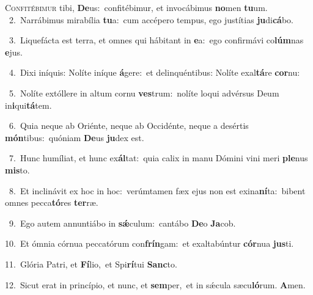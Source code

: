 \lettrine{\initial\textcolor{\initialcolor}{C}}{onfitébimur} tibi, \textbf{De}\-us:~\star confitébimur, et invocábimus \textbf{no}\-men \textbf{tu}\-um.\\
{\numbfont\textcolor{\numbcolor}{~2.}}~Narrábimus mirabília \textbf{tu}\-a:~\star cum accépero tempus, ego justítias \textbf{ju}\-di\-\textbf{cá}\-bo.\par
{\numbfont\textcolor{\numbcolor}{~3.}}~Liquefácta est terra, et omnes qui hábitant in \textbf{e}\-a:~\star ego confirmávi co\-\textbf{lúm}\-nas \textbf{e}\-jus.\par
{\numbfont\textcolor{\numbcolor}{~4.}}~Dixi iníquis: Nolíte iníque \textbf{á}\-gere:~\star et delinquéntibus: Nolíte exal\-\textbf{tá}\-re \textbf{cor}\-nu:\par
{\numbfont\textcolor{\numbcolor}{~5.}}~Nolíte extóllere in altum cornu \textbf{ves}\-trum:~\star nolíte loqui advérsus Deum in\-\textbf{i}\-qui\-\textbf{tá}\-tem.\par
{\numbfont\textcolor{\numbcolor}{~6.}}~Quia neque ab Oriénte, neque ab Occidénte, neque a desértis \textbf{món}\-tibus:~\star quóniam \textbf{De}\-us \textbf{ju}\-dex est.\par
{\numbfont\textcolor{\numbcolor}{~7.}}~Hunc humíliat, et hunc ex\-\textbf{ál}\-tat:~\star quia calix in manu Dómini vini meri \textbf{ple}\-nus \textbf{mis}\-to.\par
{\numbfont\textcolor{\numbcolor}{~8.}}~Et inclinávit ex hoc in hoc:~\dagger verúmtamen fæx ejus non est exina\-\textbf{ní}\-ta:~\star bibent omnes pecca\-\textbf{tó}\-res \textbf{ter}\-ræ.\par
{\numbfont\textcolor{\numbcolor}{~9.}}~Ego autem annuntiábo in \textbf{sǽ}\-culum:~\star cantábo \textbf{De}\-o \textbf{Ja}\-cob.\par
{\numbfont\textcolor{\numbcolor}{10.}}~Et ómnia córnua peccatórum con\-\textbf{frín}\-gam:~\star et exaltabúntur \textbf{cór}\-nua \textbf{jus}\-ti.\par
{\numbfont\textcolor{\numbcolor}{11.}}~Glória Patri, et \textbf{Fí}\-lio,~\star et Spi\-\textbf{rí}\-tui \textbf{Sanc}\-to.\par
{\numbfont\textcolor{\numbcolor}{12.}}~Sicut erat in princípio, et nunc, et \textbf{sem}\-per,~\star et in sǽcula sæcu\-\textbf{ló}\-rum. \textbf{A}\-men.\par
